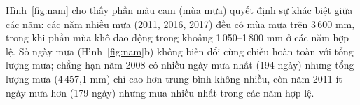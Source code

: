 
Hình~\ref{fig:nam} cho thấy phần màu cam (mùa mưa) quyết định sự khác biệt giữa các năm: các năm nhiều mưa (2011, 2016, 2017) đều có mùa mưa trên 3\,600 mm, trong khi phần mùa khô dao động trong khoảng 1\,050--1\,800 mm ở các năm hợp lệ. Số ngày mưa (Hình~\ref{fig:nam}b) không biến đổi cùng chiều hoàn toàn với tổng lượng mưa; chẳng hạn năm 2008 có nhiều ngày mưa nhất (194 ngày) nhưng tổng lượng mưa (4\,457,1 mm) chỉ cao hơn trung bình không nhiều, còn năm 2011 ít ngày mưa hơn (179 ngày) nhưng mưa nhiều nhất trong các năm hợp lệ.
